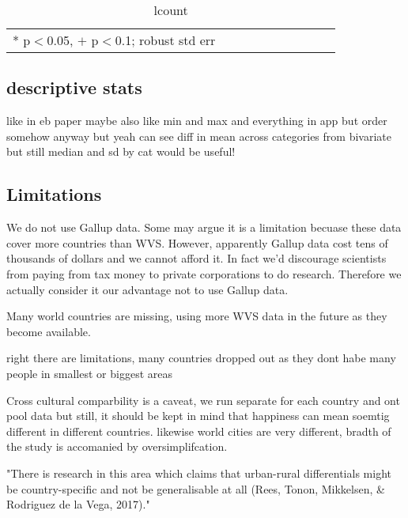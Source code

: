 \documentclass[10pt, letterpaper]{article}
\begin{document}
\begin{spacing}{.9} \begin{table}[H]\centering \caption{.} \label{d1} \begin{scriptsize} \begin{tabular}{llllllllll}\hline  \hline   * p$<$0.05, $+$ p$<$0.1; robust std err \end{tabular}\end{scriptsize}\caption{lcount}\end{table} \end{spacing}


\begin{spacing}{1.4} %


\section{descriptive stats}

like in eb paper maybe also like min and max and everything
in app but order somehow anyway but yeah can see diff in mean across categories
from bivariate but still median and sd by cat would be useful!


\subsection{Limitations}

We do not use Gallup data. Some may argue it is a limitation becuase these data
cover more countries than WVS. However, apparently Gallup data cost tens of
thousands of dollars and we cannot afford it. In fact we'd discourage scientists
from paying from tax money to private corporations to do research. Therefore we
actually consider it our advantage not to use Gallup data.

Many world countries are missing, using more WVS data in the future as they
become available. 

right there are limitations, many countries dropped out as they dont habe many
people in smallest or biggest areas

Cross cultural comparbility is a caveat, we run separate for each country and
ont pool data but still, it should be kept in mind that happiness can mean
soemtig different in different countries. likewise world cities are very
different, bradth of the study is accomanied by oversimplifcation. 

"There is research in this area which claims that urban-rural differentials might be country-specific and not be generalisable at all (Rees, Tonon, Mikkelsen, \& Rodriguez de la Vega, 2017)."


\end{spacing}
\end{document}
